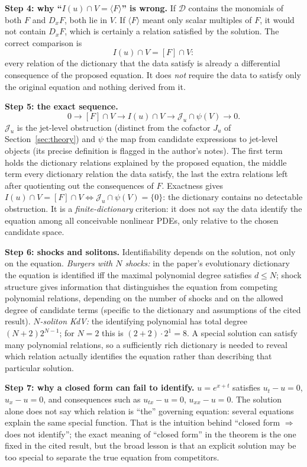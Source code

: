 \documentclass[11pt]{article}
\theoremstyle{plain}
\theoremstyle{definition}
\theoremstyle{remark}
\begin{document}
\medskip\textbf{Step 4: why ``$I(u)\cap V=\langle F\rangle$'' is wrong.} If $\mathcal D$ contains the monomials of both $F$ and $D_xF$, both lie in $V$. If $\langle F\rangle$ meant only scalar multiples of $F$, it would not contain $D_xF$, which is certainly a relation satisfied by the solution. The correct comparison is
\[
I(u)\cap V=[F]\cap V:
\]
every relation of the dictionary that the data satisfy is already a differential consequence of the proposed equation. It does \emph{not} require the data to satisfy only the original equation and nothing derived from it.

\medskip\textbf{Step 5: the exact sequence.}
\[
0\to[F]\cap V\to I(u)\cap V\to\mathcal J_u\cap\psi(V)\to0 .
\]
$\mathcal J_u$ is the jet-level obstruction (distinct from the cofactor $J_u$ of Section~\ref{sec:theory}) and $\psi$ the map from candidate expressions to jet-level objects (its precise definition is flagged in the author's notes). The first term holds the dictionary relations explained by the proposed equation, the middle term every dictionary relation the data satisfy, the last the extra relations left after quotienting out the consequences of $F$. Exactness gives $I(u)\cap V=[F]\cap V\iff\mathcal J_u\cap\psi(V)=\{0\}$: the dictionary contains no detectable obstruction. It is a \emph{finite-dictionary} criterion: it does not say the data identify the equation among all conceivable nonlinear PDEs, only relative to the chosen candidate space.

\medskip\textbf{Step 6: shocks and solitons.} Identifiability depends on the solution, not only on the equation. \emph{Burgers with $N$ shocks:} in the paper's evolutionary dictionary the equation is identified iff the maximal polynomial degree satisfies $d\le N$; shock structure gives information that distinguishes the equation from competing polynomial relations, depending on the number of shocks and on the allowed degree of candidate terms (specific to the dictionary and assumptions of the cited result). \emph{$N$-soliton KdV:} the identifying polynomial has total degree $(N+2)2^{N-1}$; for $N=2$ this is $(2+2)\cdot2^{1}=8$. A special solution can satisfy many polynomial relations, so a sufficiently rich dictionary is needed to reveal which relation actually identifies the equation rather than describing that particular solution.

\medskip\textbf{Step 7: why a closed form can fail to identify.} $u=e^{x+t}$ satisfies $u_t-u=0$, $u_x-u=0$, and consequences such as $u_{tx}-u=0$, $u_{xx}-u=0$. The solution alone does not say which relation is ``the'' governing equation: several equations explain the same special function. That is the intuition behind ``closed form $\Rightarrow$ does not identify''; the exact meaning of ``closed form'' in the theorem is the one fixed in the cited result, but the broad lesson is that an explicit solution may be too special to separate the true equation from competitors.
\end{document}
